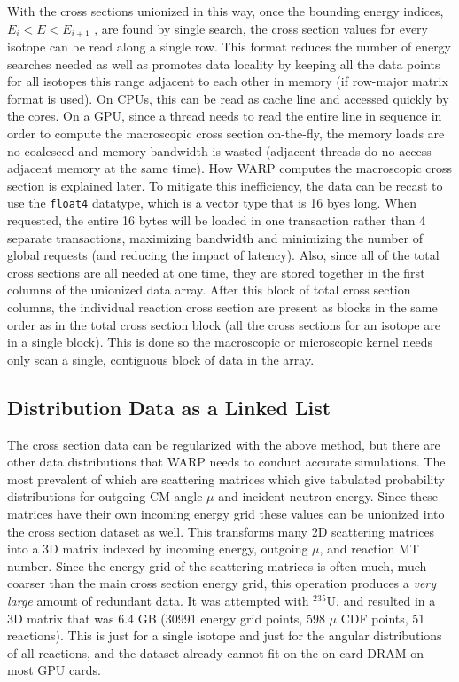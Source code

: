 With the cross sections unionized in this way, once the bounding energy indices, $E_i<E<E_{i+1}$ , are found by single search, the cross section values for every isotope can be read along a single row.  This format reduces the number of energy searches needed as well as promotes data locality by keeping all the data points for all isotopes this range adjacent to each other in memory (if row-major matrix format is used).  On CPUs, this can be read as cache line and accessed quickly by the cores.  On a GPU, since a thread needs to read the entire line in sequence in order to compute the macroscopic cross section on-the-fly, the memory loads are no coalesced and memory bandwidth is wasted (adjacent threads do no access adjacent memory at the same time).  How WARP computes the macroscopic cross section is explained later.  To mitigate this inefficiency, the data can be recast to use the  \lstinline{float4} datatype, which is a vector type that is 16 byes long.  When requested, the entire 16 bytes will be loaded in one transaction rather than 4 separate transactions, maximizing bandwidth and minimizing the number of global requests (and reducing the impact of latency).  Also, since all of the total cross sections are all needed at one time, they are stored together in the first columns of the unionized data array.  After this block of total cross section columns, the individual reaction cross section are present as blocks in the same order as in the total cross section block (all the cross sections for an isotope are in a single block).  This is done so the macroscopic or microscopic kernel needs only scan a single, contiguous block of data in the array.

\subsection{Distribution Data as a Linked List}

The cross section data can be regularized with the above method, but there are other data distributions that WARP needs to conduct accurate simulations.  The most prevalent of which are scattering matrices which give tabulated probability distributions for outgoing CM angle $\mu$ and incident neutron energy.  Since these matrices have their own incoming energy grid these values can be unionized into the cross section dataset as well.  This transforms many 2D scattering matrices into a 3D matrix indexed by incoming energy, outgoing $\mu$, and reaction MT number.  Since the energy grid of the scattering matrices is often much, much coarser than the main cross section energy grid, this operation produces a \emph{very large} amount of redundant data.  It was attempted with $^{235}$U, and resulted in a 3D matrix that was 6.4 GB (30991 energy grid points, 598 $\mu$ CDF points, 51 reactions).  This is just for a single isotope and just for the angular distributions of all reactions, and the dataset already cannot fit on the on-card DRAM on most GPU cards.  

